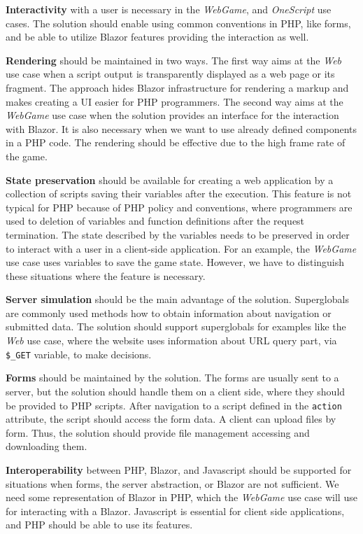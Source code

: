 \par
\textbf{Interactivity} with a user is necessary in the \textit{WebGame}, and \textit{OneScript} use cases.
The solution should enable using common conventions in PHP, like forms, and be able to utilize Blazor features providing the interaction as well.
\par
\textbf{Rendering} should be maintained in two ways.
The first way aims at the \textit{Web} use case when a script output is transparently displayed as a web page or its fragment.
The approach hides Blazor infrastructure for rendering a markup and makes creating a UI easier for PHP programmers.
The second way aims at the \textit{WebGame} use case when the solution provides an interface for the interaction with Blazor.
It is also necessary when we want to use already defined components in a PHP code.
The rendering should be effective due to the high frame rate of the game.
\par
\textbf{State preservation} should be available for creating a web application by a collection of scripts saving their variables after the execution.
This feature is not typical for PHP because of PHP policy and conventions, where programmers are used to deletion of variables and function definitions after the request termination.
The state described by the variables needs to be preserved in order to interact with a user in a client-side application. 
For an example, the \textit{WebGame} use case uses variables to save the game state. 
However, we have to distinguish these situations where the feature is necessary.
\par
\textbf{Server simulation} should be the main advantage of the solution.
Superglobals are commonly used methods how to obtain information about navigation or submitted data.
The solution should support superglobals for examples like the \textit{Web} use case, where the website uses information about URL query part, via \texttt{\$\_GET} variable, to make decisions.
\par
\textbf{Forms} should be maintained by the solution. 
The forms are usually sent to a server, but the solution should handle them on a client side, where they should be provided to PHP scripts.
After navigation to a script defined in the \texttt{action} attribute, the script should access the form data.
A client can upload files by form.
Thus, the solution should provide file management accessing and downloading them.
\par
\textbf{Interoperability} between PHP, Blazor, and Javascript should be supported for situations when forms, the server abstraction, or Blazor are not sufficient.
We need some representation of Blazor in PHP, which the \textit{WebGame} use case will use for interacting with a Blazor.
Javascript is essential for client side applications, and PHP should be able to use its features.


